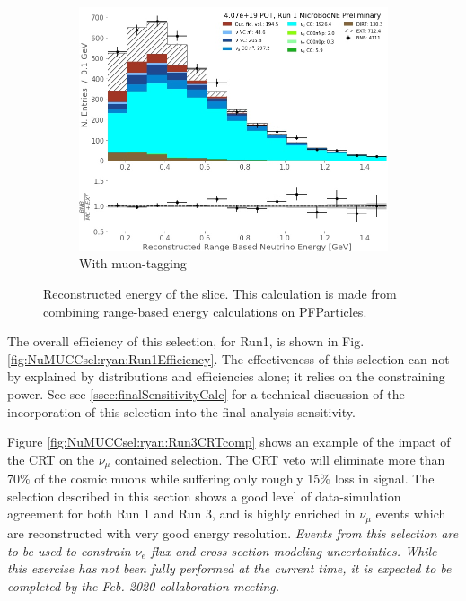 \begin{figure}[]
\begin{center}
\begin{subfigure}[b]{0.3\textwidth}
    \end{subfigure} %
    \begin{subfigure}[b]{0.3\textwidth}
    \centering
    \includegraphics[width=1.00\textwidth]{NuMuCCsel/Images/Ryan/Run1_recoErange_fullSel.jpg}
    \caption{\label{fig:NuMUCCsel:ryan:trklenFull} With muon-tagging}
    \end{subfigure}
\caption{Reconstructed energy of the slice. This calculation is made from combining range-based energy calculations on PFParticles.}
\end{center}
\end{figure}

\par The overall efficiency of this selection, for Run1, is shown in Fig. \ref{fig:NuMUCCsel:ryan:Run1Efficiency}. The effectiveness of this selection can not by explained by distributions and efficiencies alone; it relies on the constraining power. See sec \ref{ssec:finalSensitivityCalc} for a technical discussion of the incorporation of this selection into the final analysis sensitivity.

Figure \ref{fig:NuMUCCsel:ryan:Run3CRTcomp} shows an example of the impact of the CRT on the $\nu_\mu$ contained selection. The CRT veto will eliminate more than 70$\%$ of the cosmic muons while suffering only roughly 15$\%$ loss in signal.
The selection described in this section shows a good level of data-simulation agreement for both Run 1 and Run 3, and is highly enriched in $\nu_{\mu}$ events which are reconstructed with very good energy resolution. \emph{Events from this selection are to be used to constrain $\nu_e$ flux and cross-section modeling uncertainties. While this exercise has not been fully performed at the current time, it is expected to be completed by the Feb. 2020 collaboration meeting.}

